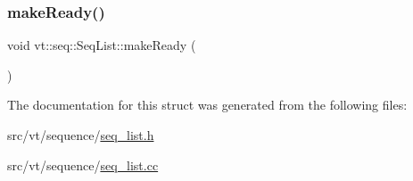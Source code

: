 \mbox{\label{structvt_1_1seq_1_1_seq_list_a4b61d77fef5723835e70d62c65bbc758}} 
\subsubsection{\texorpdfstring{make\+Ready()}{makeReady()}}
{\footnotesize\ttfamily void vt\+::seq\+::\+Seq\+List\+::make\+Ready (\begin{DoxyParamCaption}{ }\end{DoxyParamCaption})}



The documentation for this struct was generated from the following files\+:\begin{DoxyCompactItemize}
\item 
src/vt/sequence/\hyperlink{seq__list_8h}{seq\+\_\+list.\+h}\item 
src/vt/sequence/\hyperlink{seq__list_8cc}{seq\+\_\+list.\+cc}\end{DoxyCompactItemize}
